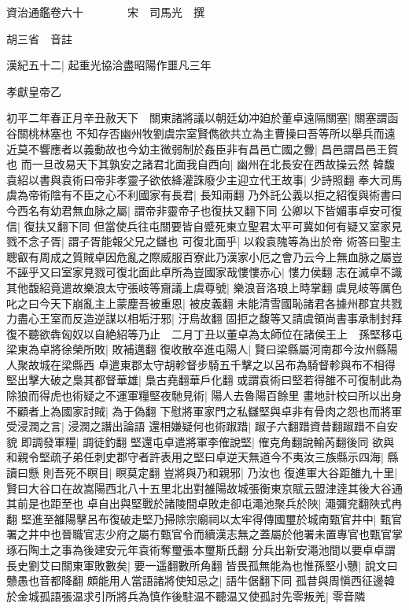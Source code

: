 資治通鑑卷六十　　　　宋　司馬光　撰

胡三省　音註

漢紀五十二|{
	起重光協洽盡昭陽作噩凡三年}


孝獻皇帝乙

初平二年春正月辛丑赦天下　關東諸將議以朝廷幼冲廹於董卓遠隔關塞|{
	關塞謂函谷關桃林塞也}
不知存否幽州牧劉虞宗室賢儁欲共立為主曹操曰吾等所以舉兵而遠近莫不響應者以義動故也今幼主微弱制於姦臣非有昌邑亡國之釁|{
	昌邑謂昌邑王賀也}
而一旦改易天下其孰安之諸君北面我自西向|{
	幽州在北長安在西故操云然}
韓馥袁紹以書與袁術曰帝非孝靈子欲依絳灌誅廢少主迎立代王故事|{
	少詩照翻}
奉大司馬虞為帝術陰有不臣之心不利國家有長君|{
	長知兩翻}
乃外託公義以拒之紹復與術書曰今西名有幼君無血脉之屬|{
	謂帝非靈帝子也復扶又翻下同}
公卿以下皆媚事卓安可復信|{
	復扶又翻下同}
但當使兵往屯關要皆自蹙死東立聖君太平可冀如何有疑又室家見戮不念子胥|{
	謂子胥能報父兄之讎也}
可復北面乎|{
	以殺袁隗等為出於帝}
術答曰聖主聰叡有周成之質賊卓因危亂之際威服百寮此乃漢家小厄之會乃云今上無血脉之屬豈不誣乎又曰室家見戮可復北面此卓所為豈國家哉慺慺赤心|{
	慺力侯翻}
志在滅卓不識其他馥紹竟遣故樂浪太守張岐等齎議上虞尊號|{
	樂浪音洛琅上時掌翻}
虞見岐等厲色叱之曰今天下崩亂主上蒙塵吾被重恩|{
	被皮義翻}
未能清雪國恥諸君各據州郡宜共戮力盡心王室而反造逆謀以相垢汙邪|{
	汙烏故翻}
固拒之馥等又請虞領尚書事承制封拜復不聽欲犇匈奴以自絶紹等乃止　二月丁丑以董卓為太師位在諸侯王上　孫堅移屯梁東為卓將徐榮所敗|{
	敗補邁翻}
復收散卒進屯陽人|{
	賢曰梁縣屬河南郡今汝州縣陽人聚故城在梁縣西}
卓遣東郡太守胡軫督步騎五千擊之以呂布為騎督軫與布不相得堅出擊大破之梟其都督華雄|{
	梟古堯翻華戶化翻}
或謂袁術曰堅若得雒不可復制此為除狼而得虎也術疑之不運軍糧堅夜馳見術|{
	陽人去魯陽百餘里}
畫地計校曰所以出身不顧者上為國家討賊|{
	為于偽翻}
下慰將軍家門之私讎堅與卓非有骨肉之怨也而將軍受浸潤之言|{
	浸潤之譖出論語}
還相嫌疑何也術踧踖|{
	踧子六翻踖資昔翻踧踖不自安貌}
即調發軍糧|{
	調徒釣翻}
堅還屯卓遣將軍李傕說堅|{
	傕克角翻說輸芮翻後同}
欲與和親令堅疏子弟任刺史郡守者許表用之堅曰卓逆天無道今不夷汝三族縣示四海|{
	縣讀曰懸}
則吾死不瞑目|{
	瞑莫定翻}
豈將與乃和親邪|{
	乃汝也}
復進軍大谷距雒九十里|{
	賢曰大谷口在故嵩陽西北八十五里北出對雒陽故城張衡東京賦云盟津逹其後大谷通其前是也距至也}
卓自出與堅戰於諸陵間卓敗走卻屯澠池聚兵於陜|{
	澠彌兖翻陜式冉翻}
堅進至雒陽擊呂布復破走堅乃掃除宗廟祠以太牢得傳國璽於城南甄官井中|{
	甄官署之井中也晉職官志少府之屬冇甄官令而續漢志無之蓋屬於他署未置專官也甄官掌琢石陶土之事為後建安元年袁術奪璽張本璽斯氏翻}
分兵出新安澠池間以要卓卓謂長史劉艾曰關東軍敗數矣|{
	要一遥翻數所角翻}
皆畏孤無能為也惟孫堅小戇|{
	說文曰戇愚也音都降翻}
頗能用人當語諸將使知忌之|{
	語牛倨翻下同}
孤昔與周愼西征邊韓於金城孤語張温求引所將兵為慎作後駐温不聽温又使孤討先零叛羌|{
	零音隣}
